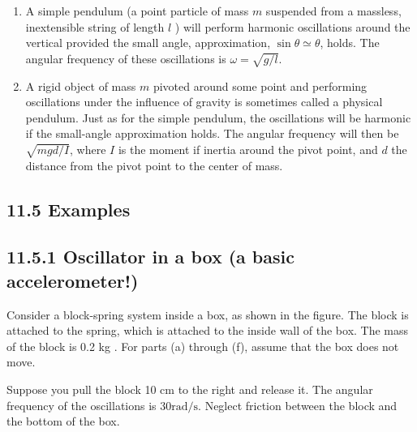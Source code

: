 \documentclass[10pt]{article}
\begin{document}
\begin{enumerate}
  \item A simple pendulum (a point particle of mass $m$ suspended from a massless, inextensible string of length $l$ ) will perform harmonic oscillations around the vertical provided the small angle, approximation, $\sin \theta \simeq \theta$, holds. The angular frequency of these oscillations is $\omega=\sqrt{g / l}$.
  \item A rigid object of mass $m$ pivoted around some point and performing oscillations under the influence of gravity is sometimes called a physical pendulum. Just as for the simple pendulum, the oscillations will be harmonic if the small-angle approximation holds. The angular frequency will then be $\sqrt{m g d / I}$, where $I$ is the moment if inertia around the pivot point, and $d$ the distance from the pivot point to the center of mass.
\end{enumerate}

\subsection*{11.5 Examples}
\subsection*{11.5.1 Oscillator in a box (a basic accelerometer!)}
Consider a block-spring system inside a box, as shown in the figure. The block is attached to the spring, which is attached to the inside wall of the box. The mass of the block is 0.2 kg . For parts (a) through (f), assume that the box does not move.

Suppose you pull the block 10 cm to the right and release it. The angular frequency of the oscillations is $30 \mathrm{rad} / \mathrm{s}$. Neglect friction between the block and the bottom of the box.
\end{document}
